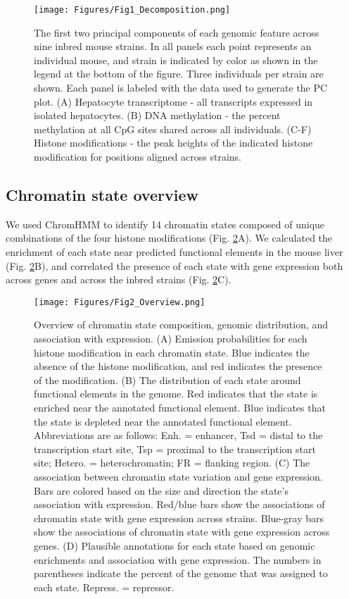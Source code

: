 \documentclass[
  11pt,
]{article}
\begin{document}
\begin{figure}[ht!]
\texttt{[image: Figures/Fig1\_Decomposition.png]} 
\caption{The first two principal components of each genomic 
feature across nine inbred mouse strains. In all panels each 
point represents an individual mouse, and strain is indicated 
by color as shown in the legend at the bottom of the figure. 
Three individuals per strain are shown. Each panel is labeled 
with the data used to generate the PC plot. (A) Hepatocyte 
transcriptome - all transcripts expressed in isolated hepatocytes. 
(B) DNA methylation - the percent methylation at all CpG sites 
shared across all individuals. (C-F) Histone modifications - 
the peak heights of the indicated histone modification for
positions aligned across strains.}
\label{fig:pc_plots}
\end{figure}

\hypertarget{chromatin-state-overview}{%
\subsection{Chromatin state overview}\label{chromatin-state-overview}}

We used ChromHMM to identify 14 chromatin states composed of unique
combinations of the four histone modifications (Fig.
\ref{fig:state_overview}A). We calculated the enrichment of each state
near predicted functional elements in the mouse liver (Fig.
\ref{fig:state_overview}B), and correlated the presence of each state
with gene expression both across genes and across the inbred strains
(Fig. \ref{fig:state_overview}C).

\begin{figure}[ht!]
\texttt{[image: Figures/Fig2\_Overview.png]} 
\caption{Overview of chromatin state composition, genomic 
distribution, and association with expression. (A) Emission 
probabilities for each histone modification in each 
chromatin state. Blue indicates the absence of the histone
modification, and red indicates the presence of the 
modification. (B) The distribution of each state around 
functional elements in the genome. Red indicates that the 
state is enriched near the annotated functional element. 
Blue indicates that the state is depleted near the annotated 
functional element. Abbreviations are as follows: 
Enh. = enhancer, Tsd = distal to the transcription start site, 
Tsp = proximal to the transcription start site; Hetero. = 
heterochromatin; FR = flanking region. (C) The association between 
chromatin state variation and gene expression. Bars are colored 
based on the size and direction the state's association with expression. 
Red/blue bars show the associations of chromatin state with gene
expression across strains. Blue-gray bars show the associations of
chromatin state with gene expression across genes. (D) Plausible 
annotations for each state based on genomic enrichments and association
with gene expression. The numbers in parentheses indicate the percent 
of the genome that was assigned to each state. Repress. = repressor.}
\label{fig:state_overview}
\end{figure}
\end{document}
